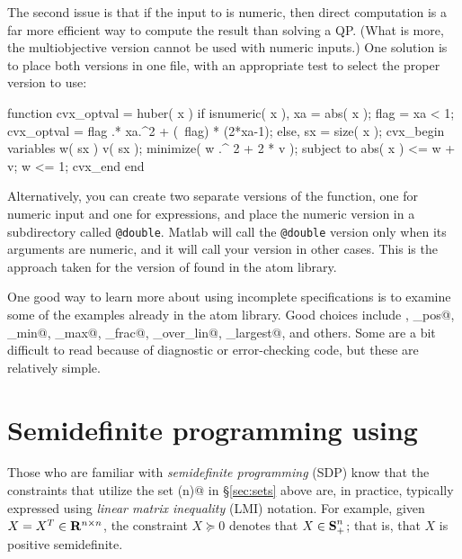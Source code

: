 \documentclass[12pt]{article}
\newcommand{\symm}{{\mbox{\bf S}}}  %
\begin{document}
The second issue is that if the input to \verb@huber@ is numeric, then
direct computation is a far more efficient way to compute the result
than solving a QP. (What is more, the multiobjective version
cannot be used with numeric inputs.) One solution is to place 
both versions in one file, with an appropriate test to select
the proper version to use:
\begin{code}
	function cvx_optval = huber( x )
	if isnumeric( x ),
	    xa   = abs( x );
	    flag = xa < 1;
	    cvx_optval = flag .* xa.^2 + (~flag) * (2*xa-1);
	else,
	    sx = size( x );
	    cvx_begin
	        variables w( sx ) v( sx );
	        minimize( w .^ 2 + 2 * v );
	        subject to
	            abs( x ) <= w + v;
	            w <= 1;
	    cvx_end
	end
\end{code}
Alternatively, you can create two separate versions of the function, one 
for numeric input and one for \cvx expressions, and 
place the numeric version in a subdirectory called
\verb+@double+. Matlab will call the \verb+@double+ version only when its
arguments are numeric, and it will call your \cvx version in other cases.
This is the approach taken for the version of \verb@huber@ found in the \cvx
atom library.

One good way to learn more about using incomplete specifications is to
examine some of the examples already in the \cvx atom library. 
Good choices include \verb@huber@, \verb@inv_pos@, \verb@lambda_min@,
\verb@lambda_max@, \verb@matrix_frac@, \verb@quad_over_lin@,
\verb@sum_largest@, and others. Some are
a bit difficult to read because of diagnostic or error-checking code,
but these are relatively simple.

\newpage
\section{Semidefinite programming using \cvx}
\label{sec:sdpmode}

Those who are familiar with \emph{semidefinite
programming} (SDP) know that the constraints that utilize
the set \verb@semidefinite(n)@ in \S\ref{sec:sets} above are, in practice, typically
expressed using \emph{linear matrix inequality} (LMI) notation. 
For example, given $X=X^T\in\mathbf{R}^{{n}\times{n}}$, the
constraint $X\succeq 0$ denotes that $X\in\symm^n_+$; that is, that
$X$ is positive semidefinite.
\end{document}
